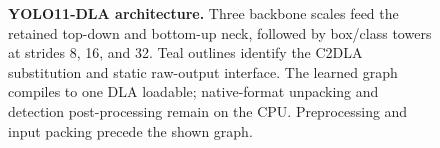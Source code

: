 \begin{figure}[t]
\centering
\resizebox{\textwidth}{!}{}
\caption{\textbf{YOLO11-DLA architecture.} Three backbone scales feed the retained
 top-down and bottom-up neck, followed by box/class towers at strides 8, 16, and 32.
 Teal outlines identify the C2DLA substitution and static raw-output interface.
 The learned graph compiles to one DLA loadable; native-format unpacking and detection
 post-processing remain on the CPU. Preprocessing and input packing precede the shown graph.}
\label{fig:boundary}
\end{figure}
